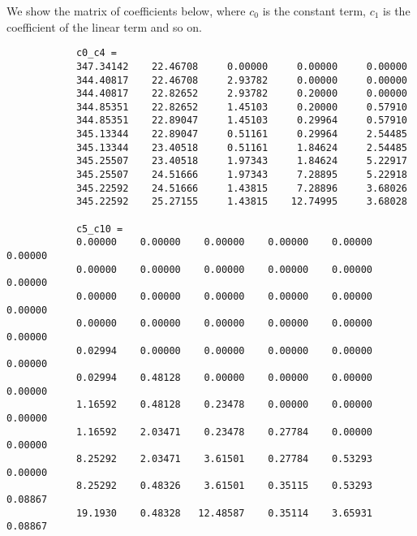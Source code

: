 \documentclass[11pt,a4paper]{article}
\begin{document}
We show the matrix of coefficients below, where $c_0$ is the constant term, $c_1$ is the coefficient of the linear term and so on.
		\begin{verbatim}
			c0_c4 =
			347.34142    22.46708     0.00000     0.00000     0.00000
			344.40817    22.46708     2.93782     0.00000     0.00000
			344.40817    22.82652     2.93782     0.20000     0.00000
			344.85351    22.82652     1.45103     0.20000     0.57910
			344.85351    22.89047     1.45103     0.29964     0.57910
			345.13344    22.89047     0.51161     0.29964     2.54485
			345.13344    23.40518     0.51161     1.84624     2.54485
			345.25507    23.40518     1.97343     1.84624     5.22917
			345.25507    24.51666     1.97343     7.28895     5.22918
			345.22592    24.51666     1.43815     7.28896     3.68026
			345.22592    25.27155     1.43815    12.74995     3.68028
			
			c5_c10 =
			0.00000    0.00000    0.00000    0.00000    0.00000    0.00000
			0.00000    0.00000    0.00000    0.00000    0.00000    0.00000
			0.00000    0.00000    0.00000    0.00000    0.00000    0.00000
			0.00000    0.00000    0.00000    0.00000    0.00000    0.00000
			0.02994    0.00000    0.00000    0.00000    0.00000    0.00000
			0.02994    0.48128    0.00000    0.00000    0.00000    0.00000
			1.16592    0.48128    0.23478    0.00000    0.00000    0.00000
			1.16592    2.03471    0.23478    0.27784    0.00000    0.00000
			8.25292    2.03471    3.61501    0.27784    0.53293    0.00000
			8.25292    0.48326    3.61501    0.35115    0.53293    0.08867
			19.1930    0.48328   12.48587    0.35114    3.65931    0.08867
		\end{verbatim}
\end{document}
